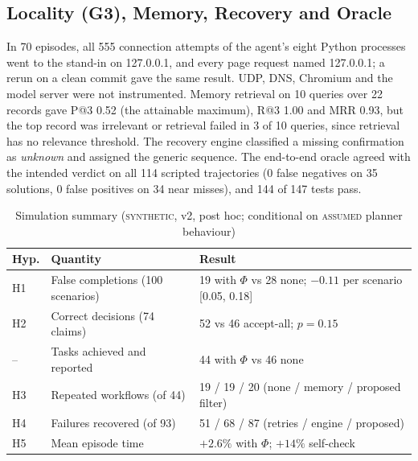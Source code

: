\documentclass[conference]{IEEEtran}
\newcommand{\status}[1]{\textsc{#1}}
\begin{document}
\subsection{Locality (G3), Memory, Recovery and Oracle}
In 70 episodes, all 555 connection attempts of the agent's eight Python processes went to the stand-in on 127.0.0.1, and every page request named 127.0.0.1; a rerun on a clean commit gave the same result. UDP, DNS, Chromium and the model server were not instrumented. Memory retrieval on 10 queries over 22 records gave P@3 0.52 (the attainable maximum), R@3 1.00 and MRR 0.93, but the top record was irrelevant or retrieval failed in 3 of 10 queries, since retrieval has no relevance threshold. The recovery engine classified a missing confirmation as \emph{unknown} and assigned the generic sequence. The end-to-end oracle agreed with the intended verdict on all 114 scripted trajectories (0 false negatives on 35 solutions, 0 false positives on 34 near misses), and 144 of 147 tests pass.

\begin{table}[t]
\centering
\caption{Simulation summary (\status{synthetic}, v2, post hoc; conditional on \status{assumed} planner behaviour)}
\label{tab:sim}
\footnotesize
\setlength{\tabcolsep}{3pt}
\begin{tabular}{@{}p{0.6cm}p{3.3cm}p{3.9cm}@{}}
\toprule
Hyp. & Quantity & Result\\
\midrule
H1 & False completions (100 scenarios) & 19 with $\Phi$ vs 28 none; $-0.11$ per scenario [0.05, 0.18]\\
H2 & Correct decisions (74 claims) & 52 vs 46 accept-all; $p=0.15$\\
-- & Tasks achieved and reported & 44 with $\Phi$ vs 46 none\\
H3 & Repeated workflows (of 44) & 19 / 19 / 20 (none / memory / proposed filter)\\
H4 & Failures recovered (of 93) & 51 / 68 / 87 (retries / engine / proposed)\\
H5 & Mean episode time & $+2.6\%$ with $\Phi$; $+14\%$ self-check\\
\bottomrule
\end{tabular}
\end{table}
\end{document}
